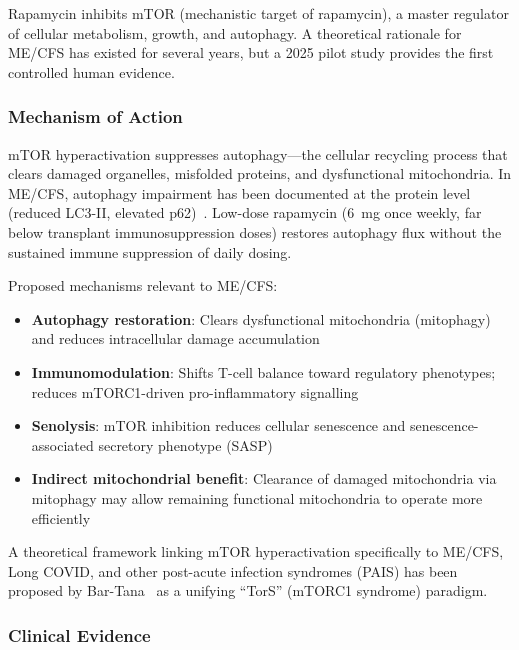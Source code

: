 Rapamycin inhibits mTOR (mechanistic target of rapamycin), a master regulator of cellular metabolism, growth, and autophagy. A theoretical rationale for ME/CFS has existed for several years, but a 2025 pilot study provides the first controlled human evidence.

\subsubsection{Mechanism of Action}

mTOR hyperactivation suppresses autophagy---the cellular recycling process that clears damaged organelles, misfolded proteins, and dysfunctional mitochondria. In ME/CFS, autophagy impairment has been documented at the protein level (reduced LC3-II, elevated p62)~\cite{Ruan2025rapamycin}. Low-dose rapamycin (6~mg once weekly, far below transplant immunosuppression doses) restores autophagy flux without the sustained immune suppression of daily dosing.

Proposed mechanisms relevant to ME/CFS:
\begin{itemize}
    \item \textbf{Autophagy restoration}: Clears dysfunctional mitochondria (mitophagy) and reduces intracellular damage accumulation
    \item \textbf{Immunomodulation}: Shifts T-cell balance toward regulatory phenotypes; reduces mTORC1-driven pro-inflammatory signalling
    \item \textbf{Senolysis}: mTOR inhibition reduces cellular senescence and senescence-associated secretory phenotype (SASP)
    \item \textbf{Indirect mitochondrial benefit}: Clearance of damaged mitochondria via mitophagy may allow remaining functional mitochondria to operate more efficiently
\end{itemize}

A theoretical framework linking mTOR hyperactivation specifically to ME/CFS, Long COVID, and other post-acute infection syndromes (PAIS) has been proposed by Bar-Tana~\cite{BarTana2025mTOR} as a unifying ``TorS'' (mTORC1 syndrome) paradigm.

\subsubsection{Clinical Evidence}

